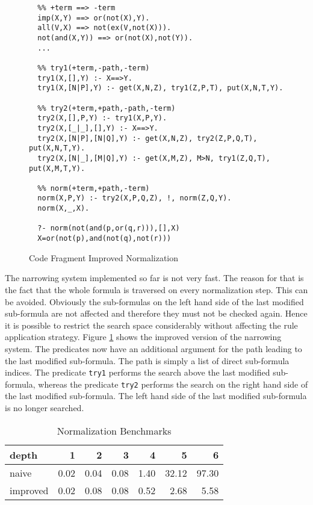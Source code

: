 \begin{figure}
{\small
\begin{verbatim}
  %% +term ==> -term
  imp(X,Y) ==> or(not(X),Y).
  all(V,X) ==> not(ex(V,not(X))).
  not(and(X,Y)) ==> or(not(X),not(Y)).
  ...

  %% try1(+term,-path,-term)
  try1(X,[],Y) :- X==>Y.
  try1(X,[N|P],Y) :- get(X,N,Z), try1(Z,P,T), put(X,N,T,Y).

  %% try2(+term,+path,-path,-term)
  try2(X,[],P,Y) :- try1(X,P,Y).
  try2(X,[_|_],[],Y) :- X==>Y.
  try2(X,[N|P],[N|Q],Y) :- get(X,N,Z), try2(Z,P,Q,T), put(X,N,T,Y).
  try2(X,[N|_],[M|Q],Y) :- get(X,M,Z), M>N, try1(Z,Q,T), put(X,M,T,Y).

  %% norm(+term,+path,-term)
  norm(X,P,Y) :- try2(X,P,Q,Z), !, norm(Z,Q,Y).
  norm(X,_,X).

  ?- norm(not(and(p,or(q,r))),[],X)
  X=or(not(p),and(not(q),not(r)))
\end{verbatim}
}
\caption{Code Fragment Improved Normalization}
\label{prgimpnorm}
\end{figure}

The narrowing system implemented so far is not very fast. The reason for that is the fact that
the whole formula is traversed on every normalization step. This can be avoided. Obviously
the sub-formulas on the left hand side of the last modified sub-formula are not affected and
therefore they must not be checked again. Hence it is possible to restrict the search space 
considerably without affecting the rule application strategy. Figure \ref{prgimpnorm} shows
the improved version of the narrowing system. The predicates now have an additional argument
for the path leading to the last modified sub-formula. The path is simply a list of direct 
sub-formula indices. The predicate \verb.try1. performs the search above the last modified
sub-formula, whereas the predicate \verb.try2. performs the search on the right hand side of 
the last modified sub-formula. The left hand side of the last modified sub-formula is no 
longer searched.

\begin{table}
\begin{center}
\begin{tabular}{l|rrrrrr}
depth & 1 & 2 & 3 & 4 & 5 & 6 \\
\hline
naive & 0.02 & 0.04 & 0.08 & 1.40 & 32.12 & 97.30 \\
improved & 0.02 & 0.08 & 0.08 & 0.52 & 2.68 & 5.58 \\
\end{tabular}
\end{center}
\caption{Normalization Benchmarks}
\label{tabtiming}
\end{table}

